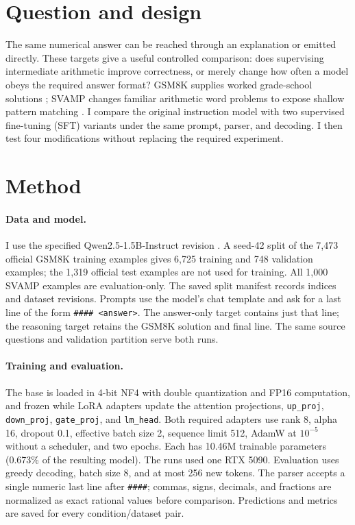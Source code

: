 \documentclass[11pt]{article}
\begin{document}
\section{Question and design}
The same numerical answer can be reached through an explanation or emitted directly. These targets give a useful controlled comparison: does supervising intermediate arithmetic improve correctness, or merely change how often a model obeys the required answer format? GSM8K supplies worked grade-school solutions \citep{cobbe2021gsm8k}; SVAMP changes familiar arithmetic word problems to expose shallow pattern matching \citep{patel2021svamp}. I compare the original instruction model with two supervised fine-tuning (SFT) variants under the same prompt, parser, and decoding. I then test four modifications without replacing the required experiment.

\section{Method}
\paragraph{Data and model.} I use the specified Qwen2.5-1.5B-Instruct revision \citep{qwen2024qwen25}. A seed-42 split of the 7,473 official GSM8K training examples gives 6,725 training and 748 validation examples; the 1,319 official test examples are not used for training. All 1,000 SVAMP examples are evaluation-only. The saved split manifest records indices and dataset revisions. Prompts use the model's chat template and ask for a last line of the form \texttt{\#\#\#\# <answer>}. The answer-only target contains just that line; the reasoning target retains the GSM8K solution and final line. The same source questions and validation partition serve both runs.

\paragraph{Training and evaluation.} The base is loaded in 4-bit NF4 with double quantization and FP16 computation, and frozen while LoRA adapters \citep{hu2022lora,dettmers2023qlora} update the attention projections, \texttt{up\_proj}, \texttt{down\_proj}, \texttt{gate\_proj}, and \texttt{lm\_head}. Both required adapters use rank 8, alpha 16, dropout 0.1, effective batch size 2, sequence limit 512, AdamW at $10^{-5}$ without a scheduler, and two epochs. Each has 10.46M trainable parameters (0.673\% of the resulting model). The runs used one RTX 5090. Evaluation uses greedy decoding, batch size 8, and at most 256 new tokens. The parser accepts a single numeric last line after \texttt{\#\#\#\#}; commas, signs, decimals, and fractions are normalized as exact rational values before comparison. Predictions and metrics are saved for every condition/dataset pair.
\end{document}
